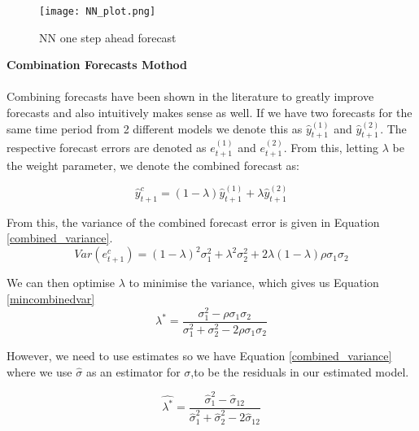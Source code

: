 \documentclass[11pt]{article}
\begin{document}
\begin{figure}[H]
\centering
\begin{minipage}{0.8\textwidth}
  \centering
  \texttt{[image: NN\_plot.png]}
   \caption{NN one step ahead forecast}
   \label{fig: NN_plot}
\end{minipage}%
\end{figure}


\noindent \textbf{Combination Forecasts Mothod}
\\
\\
\noindent Combining forecasts have been shown in the literature to greatly improve forecasts and also intuitively makes sense as well. If we have two forecasts for the same time period from 2 different models we denote this as  $\hat{y}_{t+1}^{(1)}$ and $\hat{y}_{t+1}^{(2)}$. The respective forecast errors are denoted as $e_{t+1}^{(1)}$ and $e_{t+1}^{(2)}$. From this, letting $\lambda$ be the weight parameter, we denote the combined forecast as:

\begin{equation}
\label{eqn:combined models}
\hat{y}_{t+1}^{c} = (1-\lambda)\hat{y}_{t+1}^{(1)} + \lambda \hat{y}_{t+1}^{(2)}
\end{equation}

\noindent From this, the variance of the combined forecast error is given in Equation \ref{combined_variance}.
\begin{equation}
\label{combined_variance}
Var(e_{t+1}^c) = (1 - \lambda)^2\sigma_1^2 + \lambda^2\sigma_2^2 + 2\lambda(1-\lambda)\rho \sigma_1\sigma_2
\end{equation}


\noindent We can then optimise $\lambda$ to minimise the variance, which gives us Equation \ref{mincombinedvar}
\begin{equation}
\label{mincombinedvar}
\lambda^* = \frac{\sigma_1^2 - \rho \sigma_1 \sigma_2}{\sigma_1^2 + \sigma_2^2 - 2\rho \sigma_1\sigma_2}
\end{equation}


\noindent However, we need to use estimates so we have Equation \ref{combined_variance} where we use $\hat{\sigma}$ as an estimator for $\sigma$,to be the residuals in our estimated model.

\begin{equation}
\label{combined_estimates}
\hat{\lambda^*} = \frac{\hat{\sigma}_1^2 -  \hat{\sigma}_{12}}{\hat{\sigma}_1^2 + \hat{\sigma}_2^2 - 2\hat{\sigma}_{12}}
\end{equation}
\end{document}
